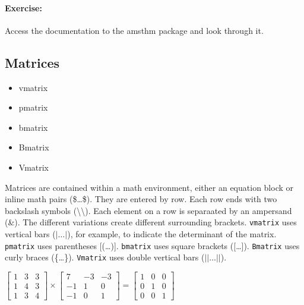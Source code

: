         \paragraph{Exercise:} Access the documentation to the amsthm package and look through it.


        \subsection{Matrices}
        \label{Matrices}
        
        \begin{cmd}
            \begin{itemize}
                \item{vmatrix}
                \item{pmatrix}
                \item{bmatrix}
                \item{Bmatrix}
                \item{Vmatrix}
            \end{itemize}
        \end{cmd}

        Matrices are contained within a math environment, either an equation block or inline math pairs (\$\ldots\$). They are entered by row. Each row ends with two backslash symbols (\textbackslash\textbackslash). Each element on a row is separaated by an ampersand (\&). The different variations create different surrounding brackets.
        \texttt{vmatrix} uses vertical bars ($|\ldots|$), for example, to indicate the determinant of the matrix.
        \texttt{pmatrix} uses parentheses [(\ldots)].
        \texttt{bmatrix} uses square brackets ([\ldots]).
        \texttt{Bmatrix} uses curly braces (\{\ldots\}).
        \texttt{Vmatrix} uses double vertical bars ($||\ldots||$).
        
        \begin{sample}
        $ \begin{bmatrix}
            1 & 3 & 3 \\
            1 & 4 & 3 \\
            1 & 3 & 4 
        \end{bmatrix}
         \times 
         \begin{bmatrix}
             7 & -3 & -3 \\
             -1 & 1 & 0 \\
             -1 & 0 & 1
         \end{bmatrix}
         =
         \begin{bmatrix}
             1 & 0 & 0 \\
             0 & 1 & 0 \\
             0 & 0 & 1
         \end{bmatrix} $
        \end{sample}

